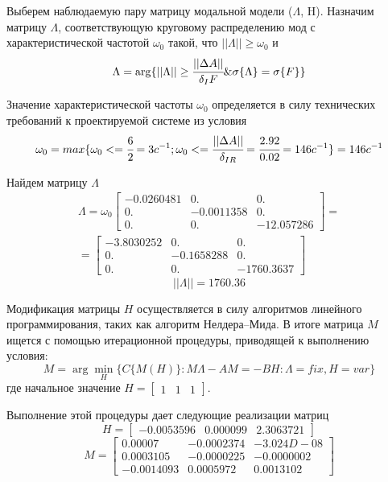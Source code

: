 Выберем наблюдаемую пару матрицу модальной модели ($\Lambda$, H). Назначим матрицу $\Lambda$, соответствующую круговому распределению мод с характеристической частотой $\omega_0$ такой, что $||\Lambda|| \ge \omega_0$ и
\begin{equation}
	\Lambda = \arg\{||\Lambda|| \ge \cfrac{||\Delta A||}{\delta_{I} F} \& \sigma\{\Lambda\} = \sigma\{F\} \}
\end{equation}

Значение характеристической частоты $\omega_0$ определяется в силу технических требований к проектируемой системе из условия
\begin{equation}
	\omega_0 = max \{\omega_0 <= \cfrac{6}{2} = 3c^{-1}; \omega_0 <= \cfrac{||\Delta A||}{\delta_{IR}} = \cfrac{2.92}{0.02} =  146c^{-1}\} = 146 c^{-1}
\end{equation}

Найдем матрицу $\Lambda$
\begin{align}
	\Lambda = \omega_0 
	\begin{bmatrix}
	  - 0.0260481&    0.   &        0.\\         
		0.    &     - 0.0011358 &   0.  \\       
		0.   &        0.      &   - 12.057286 	
	\end{bmatrix}
	=\\=
	\begin{bmatrix}
	  - 3.8030252   & 0.       &    0.\\         
		0.        & - 0.1658288&    0.  \\       
		0.        &   0.    &     - 1760.3637 
	\end{bmatrix}
\end{align}
\begin{equation}
	||\Lambda|| = 1760.36
\end{equation}

Модификация матрицы $H$ осуществляется в силу алгоритмов линейного программирования,
таких как алгоритм Нелдера–Мида. В итоге матрица $M$ ищется с помощью итерационной процедуры, приводящей к выполнению условия:
\begin{equation}
	M = \arg \min_H \{C\{M(H)\} : M \Lambda - A M = - B H : \Lambda = fix, H = var\}
\end{equation}
где начальное значение $H = \begin{bmatrix}1&1&1\end{bmatrix}$.

Выполнение этой процедуры дает следующие реализации матриц 
\begin{equation}
	H = 
	\begin{bmatrix}
	 - 0.0053596  &  0.000099  &  2.3063721 
	\end{bmatrix}
\end{equation}
\begin{equation}
	M = 
	\begin{bmatrix}
	    0.00007 &  - 0.0002374 & - 3.024D-08\\  
		0.0003105 & - 0.0000225 & - 0.0000002 \\ 
		- 0.0014093 &   0.0005972 &   0.0013102 
	\end{bmatrix}
\end{equation}


